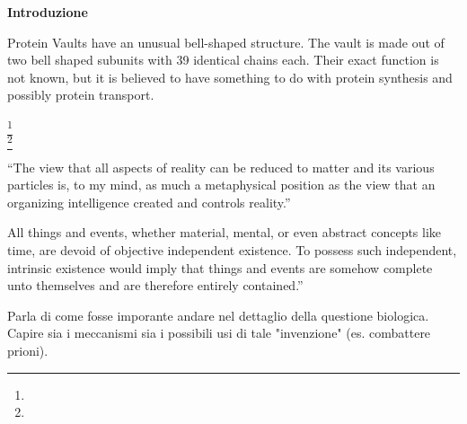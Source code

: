 
\textbf{\LARGE Introduzione}\newline\newline




Protein Vaults
have an unusual bell-shaped structure. The vault is made out of two bell shaped subunits with 39 identical chains each. Their exact function is not known, but it is believed to have something to do with protein synthesis and possibly protein transport.


\footnote{} \\

\footnote{}


“The view that all aspects of reality can be reduced to matter and its various particles is, to my mind, as much a metaphysical position as the view that an organizing intelligence created and controls reality.”

 All things and events, whether material, mental, or even abstract concepts like time, are devoid of objective independent existence. To possess such independent, intrinsic existence would imply that things and events are somehow complete unto themselves and are therefore entirely contained.”
 
 
 
 Parla di come fosse imporante andare nel dettaglio della questione biologica. Capire sia i meccanismi sia i possibili usi di tale "invenzione" (es. combattere prioni).

\clearpage


